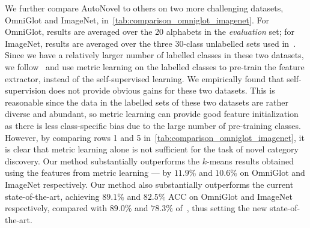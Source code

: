 We further compare AutoNovel to others on two more challenging datasets, OmniGlot and ImageNet, in~\cref{tab:comparison_omniglot_imagenet}.
For OmniGlot, results are averaged over the 20 alphabets in the \emph{evaluation} set; for ImageNet, results are averaged over the three 30-class unlabelled sets used in~\cite{Hsu18_L2C,Hsu19_MCL}.
Since we have a relatively larger number of labelled classes in these two datasets, we follow~\cite{han2019learning} and use metric learning on the labelled classes to pre-train the feature extractor, instead of the self-supervised learning.
We empirically found that self-supervision does not provide obvious gains for these two datasets.
This is reasonable since the data in the labelled sets of these two datasets are rather diverse and abundant, so metric learning can provide good feature initialization as there is less class-specific bias due to the large number of pre-training classes.
However, by comparing rows 1 and 5 in~\cref{tab:comparison_omniglot_imagenet}, it is clear that metric learning alone is not sufficient for the task of novel category discovery.
Our method substantially outperforms the $k$-means results obtained using the features from metric learning --- by $11.9\%$ and $10.6\%$ on OmniGlot and ImageNet respectively.
Our method also substantially outperforms the current state-of-the-art, achieving $89.1\%$ and $82.5\%$ ACC on OmniGlot and ImageNet respectively, compared with $89.0\%$ and $78.3\%$ of~\cite{han2019learning}, thus setting the new state-of-the-art.




